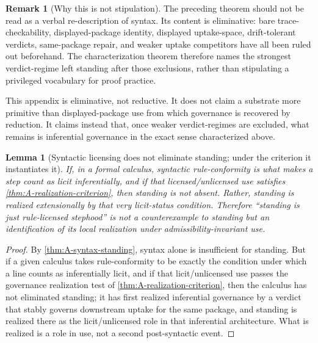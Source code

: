 \documentclass[11pt]{article}
\theoremstyle{plain}
\newtheorem{lemma}[theorem]{Lemma}
\theoremstyle{definition}
\newtheorem{remark}[theorem]{Remark}
\begin{document}
\begin{remark}[Why this is not stipulation]
The preceding theorem should not be read as a verbal re-description of syntax. Its content is eliminative: bare trace-checkability, displayed-package identity, displayed uptake-space, drift-tolerant verdicts, same-package repair, and weaker uptake competitors have all been ruled out beforehand. The characterization theorem therefore names the strongest verdict-regime left standing after those exclusions, rather than stipulating a privileged vocabulary for proof practice.

This appendix is eliminative, not reductive. It does not claim a substrate more primitive than displayed-package use from which governance is recovered by reduction. It claims instead that, once weaker verdict-regimes are excluded, what remains is inferential governance in the exact sense characterized above.
\end{remark}

\begin{lemma}[Syntactic licensing does not eliminate standing; under the criterion it instantiates it]
\label{lem:A-standing-realized}
If, in a formal calculus, syntactic rule-conformity is what makes a step count as licit inferentially, and if that licensed/unlicensed use satisfies \cref{thm:A-realization-criterion}, then standing is not absent. Rather, standing is realized extensionally by that very licit-status condition. Therefore ``standing is just rule-licensed stephood'' is not a counterexample to standing but an identification of its local realization under admissibility-invariant use.
\end{lemma}

\begin{proof}
By \cref{thm:A-syntax-standing}, syntax alone is insufficient for standing. But if a given calculus takes rule-conformity to be exactly the condition under which a line counts as inferentially licit, and if that licit/unlicensed use passes the governance realization test of \cref{thm:A-realization-criterion}, then the calculus has not eliminated standing; it has first realized inferential governance by a verdict that stably governs downstream uptake for the same package, and standing is realized there as the licit/unlicensed role in that inferential architecture. What is realized is a role in use, not a second post-syntactic event.
\end{proof}
\end{document}
